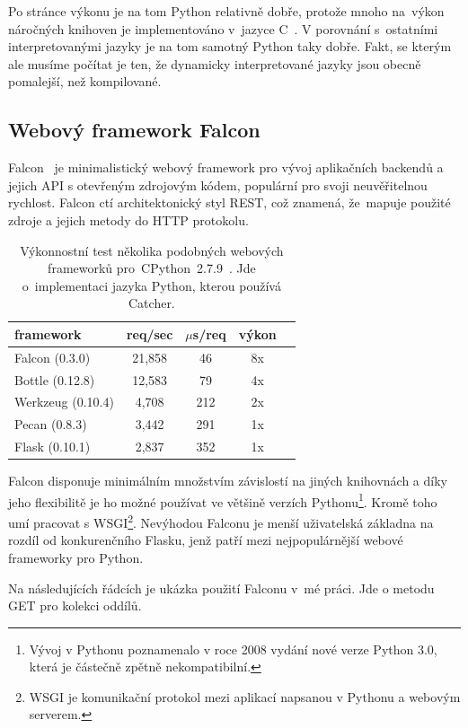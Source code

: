 Po stránce výkonu je na tom Python relativně dobře, protože mnoho na~výkon náročných knihoven je implementováno v~jazyce C~\cite{clanguage}.
V porovnání s~ostatními interpretovanými jazyky je na tom samotný Python taky dobře.
Fakt, se kterým ale musíme počítat je ten, že dynamicky interpretované jazyky jsou obecně pomalejší, než kompilované.

\subsection{Webový framework Falcon}

Falcon~\cite{falcon} je minimalistický webový framework pro vývoj aplikačních backendů a jejich API s otevřeným zdrojovým kódem,
populární pro svoji neuvěřitelnou rychlost. Falcon ctí architektonický styl REST, což znamená, že~mapuje použité
zdroje a jejich metody do HTTP protokolu.

\begin{table}[htb]
 \centering
 \begin{tabular}{|l||c|c|c|c|}\hline
 \bfseries \bfseries framework & \bfseries req/sec & \bfseries $\mu$s/req & \bfseries výkon \\[2mm]
 \hline
 Falcon (0.3.0) & 21,858 & 46 & 8x \\
 \hline
 Bottle (0.12.8) & 12,583 & 79 & 4x \\
 \hline
 Werkzeug (0.10.4) & 4,708 & 212 & 2x \\
 \hline
 Pecan (0.8.3) & 3,442 & 291 & 1x \\
 \hline
 Flask (0.10.1) & 2,837 & 352 & 1x \\
 \hline
 \end{tabular}
 \caption{Výkonnostní test několika podobných webových frameworků pro~CPython~2.7.9~\cite{falcon_benchmarks}.
 Jde o~implementaci jazyka Python, kterou používá Catcher.}
\end{table}

Falcon disponuje minimálním množstvím závislostí na jiných knihovnách a díky jeho flexibilitě je ho možné
používat ve většině verzích Pythonu\footnote{Vývoj v Pythonu poznamenalo v roce 2008 vydání nové verze Python 3.0,
která je částečně zpětně nekompatibilní.}. Kromě toho umí pracovat s WSGI\footnote{WSGI je komunikační protokol
mezi aplikací napsanou v Pythonu a webovým serverem.}. Nevýhodou Falconu je menší uživatelská
základna na rozdíl od konkurenčního Flasku, jenž patří mezi nejpopulárnější webové frameworky pro Python.

Na následujících řádcích je ukázka použití Falconu v~mé práci. Jde o metodu GET pro kolekci oddílů.

